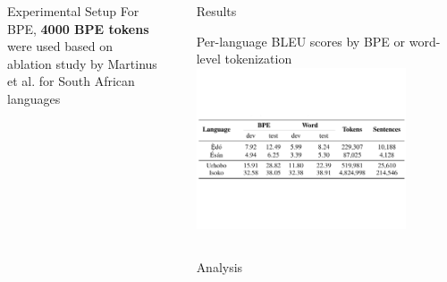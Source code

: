 \documentclass[final]{beamer}
\newlength{\sepwid}
\newlength{\onecolwid}
\newlength{\twocolwid}
\begin{document}
\begin{frame}[t]
\begin{columns}[t]
\begin{column}{\onecolwid}
\begin{block}{Experimental Setup}
For BPE, \textbf{4000 BPE tokens} were used based on ablation study by Martinus et al. for South African languages

\end{block}

\end{column} %


\begin{column}{\sepwid}\end{column} %

\begin{column}{\twocolwid} %

\begin{block}{Results}

\begin{center}
Per-language BLEU scores by BPE or word-level tokenization
  \includegraphics[trim = 0mm 60mm 0mm 50mm, clip, width=0.8\textwidth]{figures/edoid_nmt_results.pdf}
\end{center}

\end{block}

\begin{columns}[t,totalwidth=\twocolwid] %

\begin{column}{\onecolwid} %



\begin{block}{Analysis}


\end{block}
\end{column}
\end{columns}
\end{column}
\end{columns}
\end{frame}
\end{document}
